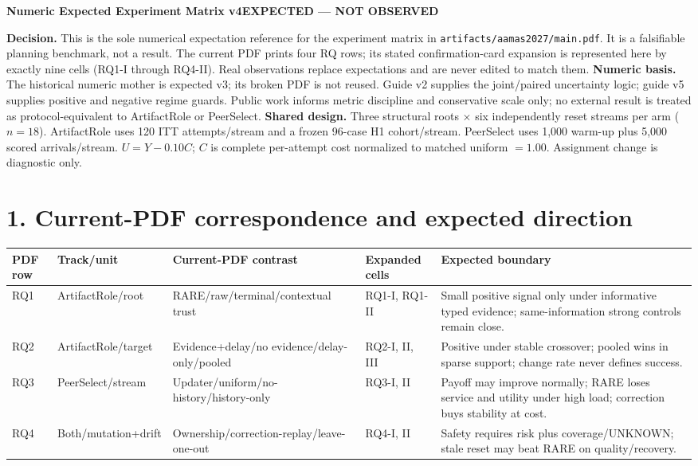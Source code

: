 \documentclass[10pt,a4paper,landscape]{article}
\begin{document}
{\LARGE\bfseries Numeric Expected Experiment Matrix v4}\hfill{\large\color{red!65!black}\bfseries EXPECTED --- NOT OBSERVED}\par
\textbf{Decision.} This is the sole numerical expectation reference for the experiment matrix in \texttt{artifacts/aamas2027/main.pdf}. It is a falsifiable planning benchmark, not a result. The current PDF prints four RQ rows; its stated confirmation-card expansion is represented here by exactly nine cells (RQ1-I through RQ4-II). Real observations replace expectations and are never edited to match them.
\textbf{Numeric basis.} The historical numeric mother is expected v3; its broken PDF is not reused. Guide v2 supplies the joint/paired uncertainty logic; guide v5 supplies positive and negative regime guards. Public work informs metric discipline and conservative scale only; no external result is treated as protocol-equivalent to ArtifactRole or PeerSelect.
\textbf{Shared design.} Three structural roots $\times$ six independently reset streams per arm ($n=18$). ArtifactRole uses 120 ITT attempts/stream and a frozen 96-case H1 cohort/stream. PeerSelect uses 1,000 warm-up plus 5,000 scored arrivals/stream. $U=Y-0.10C$; $C$ is complete per-attempt cost normalized to matched uniform $=1.00$. Assignment change is diagnostic only.
\section*{1. Current-PDF correspondence and expected direction}
\begin{center}\small\begin{tabularx}{\linewidth}{@{}C{.06\linewidth}L{.14\linewidth}L{.22\linewidth}L{.17\linewidth}Y@{}}\toprule PDF row & Track/unit & Current-PDF contrast & Expanded cells & Expected boundary \\\midrule
RQ1 & ArtifactRole/root & RARE/raw/terminal/contextual trust & RQ1-I, RQ1-II & Small positive signal only under informative typed evidence; same-information strong controls remain close. \\

RQ2 & ArtifactRole/target & Evidence+delay/no evidence/delay-only/pooled & RQ2-I, II, III & Positive under stable crossover; pooled wins in sparse support; change rate never defines success. \\

RQ3 & PeerSelect/stream & Updater/uniform/no-history/history-only & RQ3-I, II & Payoff may improve normally; RARE loses service and utility under high load; correction buys stability at cost. \\

RQ4 & Both/mutation+drift & Ownership/correction-replay/leave-one-out & RQ4-I, II & Safety requires risk plus coverage/UNKNOWN; stale reset may beat RARE on quality/recovery. \\

\bottomrule\end{tabularx}\end{center}
\end{document}
